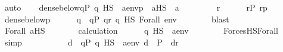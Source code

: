 \begin{isabellebody}
\ auto\isanewline
\isanewline
\ \ \isamarkupfalse%
\ {\isachardoublequoteopen}dense{\isacharunderscore}{\kern0pt}below{\isacharparenleft}{\kern0pt}{\isacharbraceleft}{\kern0pt}q{\isasymin}P{\isachardot}{\kern0pt}\ q\ {\isasymtturnstile}HS\ {\isasymphi}\ {\isacharparenleft}{\kern0pt}{\isacharbrackleft}{\kern0pt}a{\isacharbrackright}{\kern0pt}{\isacharat}{\kern0pt}env{\isacharparenright}{\kern0pt}{\isacharbraceright}{\kern0pt}{\isacharcomma}{\kern0pt}p{\isacharparenright}{\kern0pt}{\isachardoublequoteclose}\ \ {\isachardoublequoteopen}a{\isasymin}HS{\isachardoublequoteclose}\ \ a\isanewline
\ \ \isamarkupfalse%
\isanewline
\ \ \ \ \isamarkupfalse%
\ r\isanewline
\ \ \ \ \isamarkupfalse%
\ {\isachardoublequoteopen}r{\isasymin}P{\isachardoublequoteclose}\ {\isachardoublequoteopen}r{\isasympreceq}p{\isachardoublequoteclose}\isanewline
\ \ \ \ \isamarkupfalse%
\ {\isacartoucheopen}dense{\isacharunderscore}{\kern0pt}below{\isacharparenleft}{\kern0pt}{\isacharunderscore}{\kern0pt}{\isacharcomma}{\kern0pt}p{\isacharparenright}{\kern0pt}{\isacartoucheclose}\isanewline
\ \ \ \ \isamarkupfalse%
\ q\ \ {\isachardoublequoteopen}q{\isasymin}P{\isachardoublequoteclose}\ {\isachardoublequoteopen}q{\isasympreceq}r{\isachardoublequoteclose}\ {\isachardoublequoteopen}q\ {\isasymtturnstile}HS\ Forall{\isacharparenleft}{\kern0pt}{\isasymphi}{\isacharparenright}{\kern0pt}\ env{\isachardoublequoteclose}\isanewline
\ \ \ \ \ \ \isamarkupfalse%
\ blast\isanewline
\ \ \ \ \isamarkupfalse%
\isanewline
\ \ \ \ \isamarkupfalse%
\ Forall\ {\isacartoucheopen}a{\isasymin}HS{\isacartoucheclose}\isanewline
\ \ \ \ \isamarkupfalse%
\ \isamarkupfalse%
\ calculation\isanewline
\ \ \ \ \isamarkupfalse%
\ {\isachardoublequoteopen}q\ {\isasymtturnstile}HS\ {\isasymphi}\ {\isacharparenleft}{\kern0pt}{\isacharbrackleft}{\kern0pt}a{\isacharbrackright}{\kern0pt}{\isacharat}{\kern0pt}env{\isacharparenright}{\kern0pt}{\isachardoublequoteclose}\isanewline
\ \ \ \ \ \ \isamarkupfalse%
\ ForcesHS{\isacharunderscore}{\kern0pt}Forall\ \isamarkupfalse%
\ simp\isanewline
\ \ \ \ \isamarkupfalse%
\isanewline
\ \ \ \ \isamarkupfalse%
\ {\isachardoublequoteopen}{\isasymexists}d\ {\isasymin}\ {\isacharbraceleft}{\kern0pt}q{\isasymin}P{\isachardot}{\kern0pt}\ q\ {\isasymtturnstile}HS\ {\isasymphi}\ {\isacharparenleft}{\kern0pt}{\isacharbrackleft}{\kern0pt}a{\isacharbrackright}{\kern0pt}{\isacharat}{\kern0pt}env{\isacharparenright}{\kern0pt}{\isacharbraceright}{\kern0pt}{\isachardot}{\kern0pt}\ d\ {\isasymin}\ P\ {\isasymand}\ d{\isasympreceq}r{\isachardoublequoteclose}\isanewline

\end{isabellebody}
